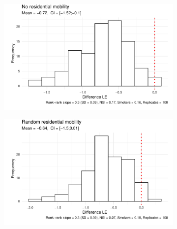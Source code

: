 \begin{figure}[htp]
    \caption{Micro-simulated life expectancy (LE) differences for the\newline rank-rank slope effect on smoking} \label{ch04:microsimulation}\vspace{5mm}
     \centering
     \begin{subfigure}[b]{0.60\textwidth}
         \centering
         \includegraphics[width=\textwidth]{plots/microsimulation/microsimulation_1.pdf}
     \end{subfigure}\vspace{5mm}
     \begin{subfigure}[b]{0.60\textwidth}
         \centering
         \includegraphics[width=\textwidth]{plots/microsimulation/microsimulation_2.pdf}
     \end{subfigure}\vspace{5mm}
     \begin{subfigure}[b]{0.60\textwidth}

\end{subfigure}
\end{figure}
